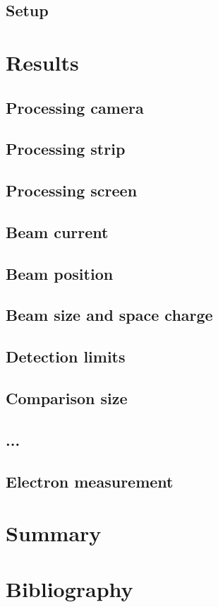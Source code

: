 \begin{refsection}
  \subsection{Setup}

  \section{Results}
  \subsection{Processing camera}
  \subsection{Processing strip}
  \cite{Brun1997,Antcheva2009}
  \subsection{Processing screen}
  \subsection{Beam current}
  \subsection{Beam position}
  \subsection{Beam size and space charge}
  \subsection{Detection limits}
  \subsection{Comparison size}
  \subsection{...}
  \subsection{Electron measurement}

  \section{Summary}
  \label{ch4:Summary}

  \cleardoublepage
  \section{Bibliography}
  \label{ch4:bib}
  \printbibliography[heading=subbibliography]

\end{refsection}